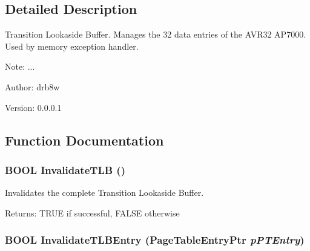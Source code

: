 \subsection{Detailed Description}
Transition Lookaside Buffer. Manages the 32 data entries of the AVR32 AP7000. Used by memory exception handler. 

\begin{Desc}
\item[Note:]... \end{Desc}
\begin{Desc}
\item[Author:]drb8w \end{Desc}
\begin{Desc}
\item[Version:]0.0.0.1 \end{Desc}


\subsection{Function Documentation}
\hypertarget{group___v_m_m___t_l_b_g89da6e0c2dad7972fda18e737fb06a84}{
\subsubsection[{InvalidateTLB}]{\setlength{\rightskip}{0pt plus 5cm}BOOL InvalidateTLB ()}}
\label{group___v_m_m___t_l_b_g89da6e0c2dad7972fda18e737fb06a84}


Invalidates the complete Transition Lookaside Buffer. \begin{Desc}
\item[Returns:]TRUE if successful, FALSE otherwise \end{Desc}
\hypertarget{group___v_m_m___t_l_b_g0aef1a11aac9970e992625e68280cad0}{
\subsubsection[{InvalidateTLBEntry}]{\setlength{\rightskip}{0pt plus 5cm}BOOL InvalidateTLBEntry ({\bf PageTableEntryPtr} {\em pPTEntry})}}
\label{group___v_m_m___t_l_b_g0aef1a11aac9970e992625e68280cad0}


